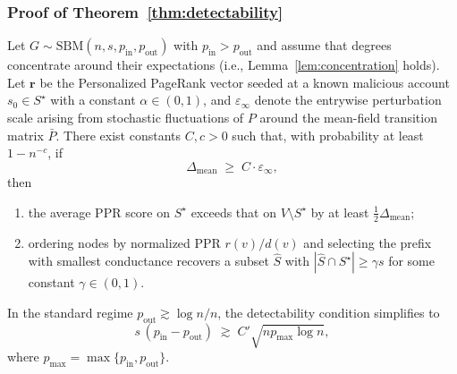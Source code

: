 \subsubsection{Proof of Theorem~\ref{thm:detectability}}
\begin{theorem}
Let $G\sim\mathrm{SBM}(n,s,p_{\mathrm{in}},p_{\mathrm{out}})$ with $p_{\mathrm{in}}>p_{\mathrm{out}}$ and assume that degrees concentrate around their expectations (i.e., Lemma~\ref{lem:concentration} holds). Let $\mathbf{r}$ be the Personalized PageRank vector seeded at a known malicious account $s_0\in S^\star$ with a constant $\alpha\in(0,1)$, and $\varepsilon_{\infty}$ denote the entrywise perturbation scale arising from stochastic fluctuations of $P$ around the mean-field transition matrix $\bar P$. There exist constants $C,c>0$ such that, with probability at least $1-n^{-c}$, if
\[
\Delta_{\mathrm{mean}} \;\ge\; C\cdot\varepsilon_{\infty},
\]
then
\begin{enumerate}
    \item the average PPR score on $S^\star$ exceeds that on $V\setminus S^\star$ by at least $\tfrac{1}{2}\Delta_{\mathrm{mean}}$;
    \item ordering nodes by normalized PPR $r(v)/d(v)$ and selecting the prefix with smallest conductance recovers a subset $\widehat S$ with $|\widehat S\cap S^\star|\ge\gamma s$ for some constant $\gamma\in(0,1)$.
\end{enumerate}
In the standard regime $p_{\mathrm{out}}\gtrsim \log n/n$,
the detectability condition simplifies to
\[
s\,(p_{\mathrm{in}}-p_{\mathrm{out}})
\;\gtrsim\;
C'\sqrt{n p_{\max}\log n},
\]
where $p_{\max}=\max\{p_{\mathrm{in}},p_{\mathrm{out}}\}$. 
\end{theorem}

